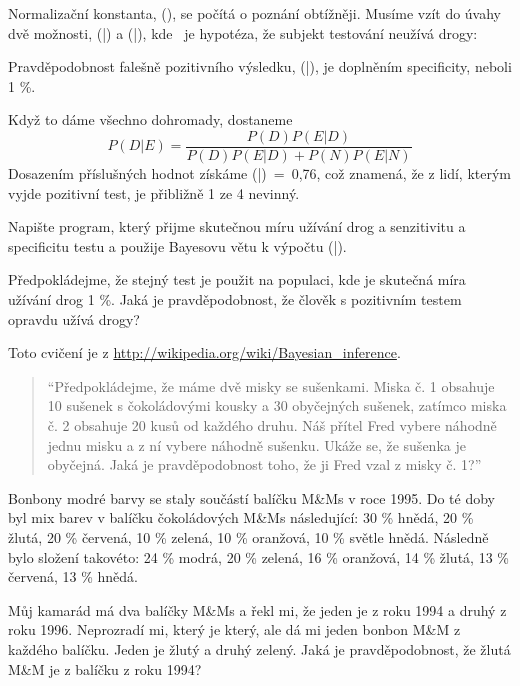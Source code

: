 \documentclass[12pt]{book}
\begin{document}
Normalizační konstanta, \Prob(\E), se počítá o poznání obtížněji. Musíme vzít do úvahy dvě možnosti, \Prob(\E|\D) a \Prob(\E|\N), kde \N~je hypotéza, že subjekt testování neužívá drogy:

\Eqn{ \Prob(\E) = \Prob(\D) \Prob(\E|\D)~+~\Prob(\N) \Prob(\E|\N) }

Pravděpodobnost falešně pozitivního výsledku, \Prob(\E|\N), je doplněním specificity, neboli 1 \%.

Když to dáme všechno dohromady, dostaneme
%
\[ P(D|E) = \frac{P(D) P(E|D)}{P(D) P(E|D) + P(N) P(E|N)}\]
%
Dosazením příslušných hodnot získáme \Prob(\D|\E)~=~0,76, což znamená, že z lidí, kterým vyjde pozitivní test, je přibližně 1 ze 4 nevinný.

\begin{exercise}
Napište program, který přijme skutečnou míru užívání drog a senzitivitu a specificitu testu a použije Bayesovu větu k výpočtu \Prob(\D|\E).

Předpokládejme, že stejný test je použit na populaci, kde je skutečná míra užívání drog 1 \%.  Jaká je pravděpodobnost, že člověk s pozitivním testem opravdu užívá drogy?

\end{exercise}


\begin{exercise}
Toto cvičení je z \url{http://wikipedia.org/wiki/Bayesian_inference}.

\begin{quote}

``Předpokládejme, že máme dvě misky se sušenkami. Miska č. 1 obsahuje 10 sušenek s čokoládovými kousky a 30 obyčejných sušenek, zatímco miska č. 2 obsahuje 20 kusů od každého druhu. Náš přítel Fred vybere náhodně jednu misku a z ní vybere náhodně sušenku. Ukáže se, že sušenka je obyčejná. Jaká je pravděpodobnost toho, že ji Fred vzal z misky č. 1?''

\end{quote}

\end{exercise}

\begin{exercise}

Bonbony modré barvy se staly součástí balíčku M\&Ms  v roce 1995.  Do té doby byl mix barev v balíčku čokoládových
M\&Ms následující: 30 \% hnědá, 20 \% žlutá, 20 \% červená, 10 \%
zelená, 10 \% oranžová, 10 \% světle hnědá.  Následně bylo složení takovéto: 24 \% modrá, 20 \%
zelená, 16 \% oranžová, 14 \% žlutá, 13 \% červená, 13 \% hnědá.


Můj kamarád má dva balíčky M\&Ms a řekl mi, že jeden je z roku 1994 a druhý z roku 1996.  Neprozradí mi, který je který, ale dá mi jeden bonbon M\&M z každého balíčku.  Jeden je žlutý a druhý zelený. Jaká je pravděpodobnost, že žlutá M\&M je z balíčku z roku 1994?

\end{exercise}
\end{document}

